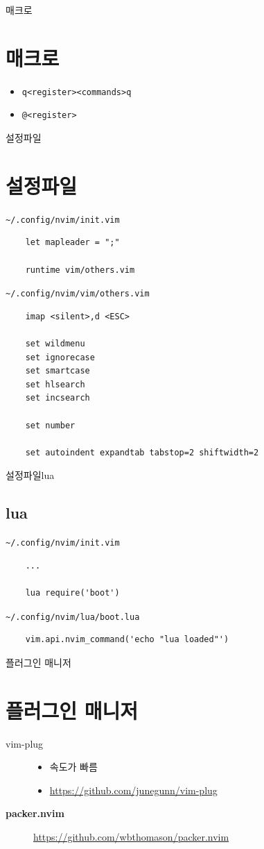 \documentclass[aspectratio=169]{beamer}
\newcommand{\ssframe}[1]{\begin{frame}[containsverbatim]{#1}\section{#1}}
\newcommand{\sssframe}[2]{\begin{frame}[containsverbatim]{#1}{#2}\subsection{#2}}
\begin{document}
\ssframe{매크로}
  \begin{itemize}
    \item \verb|q<register><commands>q|
    \item \verb|@<register>|
  \end{itemize}
\end{frame}

\ssframe{설정파일}
  \verb|~/.config/nvim/init.vim|

  \begin{verbatim}
    let mapleader = ";"

    runtime vim/others.vim
  \end{verbatim}

  \verb|~/.config/nvim/vim/others.vim|

  \begin{verbatim}
    imap <silent>,d <ESC>

    set wildmenu
    set ignorecase
    set smartcase
    set hlsearch
    set incsearch

    set number

    set autoindent expandtab tabstop=2 shiftwidth=2
  \end{verbatim}
\end{frame}

\sssframe{설정파일}{lua}
  \verb|~/.config/nvim/init.vim|

  \begin{verbatim}
    ...

    lua require('boot')
  \end{verbatim}

  \verb|~/.config/nvim/lua/boot.lua|

  \begin{verbatim}
    vim.api.nvim_command('echo "lua loaded"')
  \end{verbatim}
\end{frame}

\ssframe{플러그인 매니저}
  \begin{description}
    \item[vim-plug] 
      \begin{itemize}
        \item 속도가 빠름
        \item \url{https://github.com/junegunn/vim-plug}
      \end{itemize}
    \item[\textbf{packer.nvim}] \url{https://github.com/wbthomason/packer.nvim}
  \end{description}
\end{frame}
\end{document}
